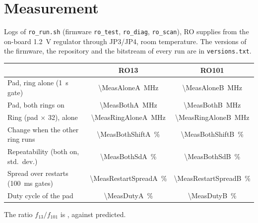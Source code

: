 \section{Measurement}
\label{sec:meas}
Logs \MeasRuns{} of \texttt{ro\_run.sh} (firmware \texttt{ro\_test}, \texttt{ro\_diag}, \texttt{ro\_scan}),
RO supplies from the on-board \SI{1.2}{V} regulator through JP3/JP4, room temperature. The versions of
the firmware, the repository and the bitstream of every run are in \texttt{versions.txt}.

\begin{center}\small
\begin{tabular}{lcc}
\toprule
 & RO13 & RO101 \\
\midrule
Pad, ring alone (\SI{1}{s} gate) & \SI{\MeasAloneA}{MHz} & \SI{\MeasAloneB}{MHz} \\
Pad, both rings on & \SI{\MeasBothA}{MHz} & \SI{\MeasBothB}{MHz} \\
Ring (pad $\times$ 32), alone & \SI{\MeasRingAloneA}{MHz} & \SI{\MeasRingAloneB}{MHz} \\
Change when the other ring runs & \SI{\MeasBothShiftA}{\percent} & \SI{\MeasBothShiftB}{\percent} \\
Repeatability (both on, std.\ dev.) & \SI{\MeasBothSdA}{\percent} & \SI{\MeasBothSdB}{\percent} \\
Spread over \MeasRestartsA{} restarts (\SI{100}{ms} gates) & \SI{\MeasRestartSpreadA}{\percent} & \SI{\MeasRestartSpreadB}{\percent} \\
Duty cycle of the pad & \SI{\MeasDutyA}{\percent} & \SI{\MeasDutyB}{\percent} \\
\bottomrule
\end{tabular}
\end{center}
The ratio $f_{13}/f_{101}$ is \MeasRatio, against \RatioAB{} predicted.

